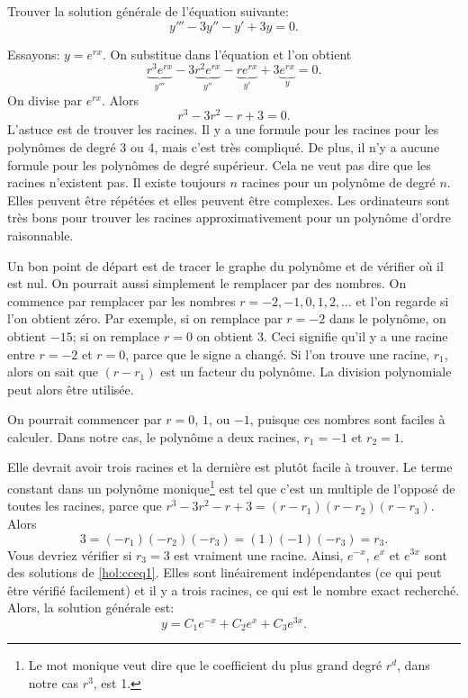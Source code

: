 \begin{example}
Trouver la solution générale de l'équation suivante:
\begin{equation} \label{hol:cceq1}
y''' - 3 y'' - y' + 3y = 0 .
\end{equation}

Essayons: $y = e^{rx}$. On substitue dans l'équation et l'on obtient\:
\begin{equation*}
\underbrace{r^3 e^{rx}}_{y'''} - 3 \underbrace{r^2 e^{rx}}_{y''} -
\underbrace{r e^{rx}}_{y'} + 3 \underbrace{e^{rx}}_{y} = 0 .
\end{equation*}
On divise par $e^{rx}$.  Alors 
\begin{equation*}
r^3 - 3 r^2 - r + 3 = 0 .
\end{equation*}
L'astuce est de trouver les racines. Il y a une formule pour les racines pour les polynômes de degré 3 ou 4, mais c'est très compliqué. De plus, il n'y a aucune formule pour les polynômes de degré supérieur. Cela ne veut pas dire que les racines n'existent pas. Il existe toujours 
$n$ racines pour un polynôme de degré  $n$.  Elles peuvent être répétées 
et elles peuvent être complexes. Les ordinateurs sont très bons pour trouver les racines approximativement pour un polynôme d'ordre  raisonnable.

Un bon point de départ est de tracer le graphe du polynôme et de vérifier où il est nul.
On pourrait aussi simplement le remplacer par des nombres. On commence par remplacer par les nombres  $r=-2,-1,0,1,2,\ldots$ et l'on regarde si l'on obtient zéro. Par exemple, si on remplace par $r=-2$ dans le polynôme, on obtient $-15$; si on remplace $r=0$ on obtient 3.
Ceci signifie qu'il y a une racine entre $r=-2$ et $r=0$,
parce que le signe a changé.
Si l'on trouve une racine, $r_1$, alors on sait que $(r-r_1)$ est un facteur du polynôme. La division polynomiale peut alors être utilisée. 

On pourrait commencer par $r=0$, $1$, ou $-1$, puisque ces nombres sont faciles à calculer. Dans notre cas, le polynôme a deux racines,  $r_1 = -1$
et $r_2 = 1$.  

Elle devrait avoir trois racines et la dernière est plutôt facile à trouver. Le terme constant dans un polynôme monique\footnote{Le mot monique veut dire que le coefficient du plus grand degré $r^d$, dans notre cas $r^3$, est 1.}
est tel que c'est un multiple de l'opposé de toutes les racines, parce que $r^3 - 3 r^2 - r + 3 = (r-r_1)(r-r_2)(r-r_3)$.
Alors
\begin{equation*}
3 = (-r_1)(-r_2)(-r_3) = (1)(-1)(-r_3) = r_3 .
\end{equation*}
Vous devriez vérifier si  $r_3 = 3$ est vraiment une racine.  Ainsi, $e^{-x}$, $e^{x}$
et $e^{3x}$ sont des solutions de \eqref{hol:cceq1}.  Elles sont linéairement indépendantes (ce qui peut être vérifié facilement) et il y a trois racines, ce qui est le nombre exact recherché. 
Alors, la solution générale est: 
\begin{equation*}
y = C_1 e^{-x} + C_2 e^{x} + C_3 e^{3x} .
\end{equation*}


\end{example}
